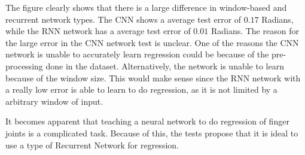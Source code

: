 \documentclass[../main.tex]{subfiles}
\begin{document}
The figure clearly shows that there is a large difference in window-based and recurrent network types.
The CNN shows a average test error of $0.17$ Radians, while the RNN network has a average test error of $0.01$ Radians. 
The reason for the large error in the CNN network test is unclear.
One of the reasons the CNN network is unable to accurately learn regression could be because of the pre-processing done in the dataset.
Alternatively, the network is unable to learn because of the window size. This would make sense since the RNN network with a really low error is able to learn to do regression, as it is not limited by a arbitrary window of input.

It becomes apparent that teaching a neural network to do regression of finger joints is a complicated task.
Because of this, the tests propose that it is ideal to use a type of Recurrent Network for regression.






\end{document}
